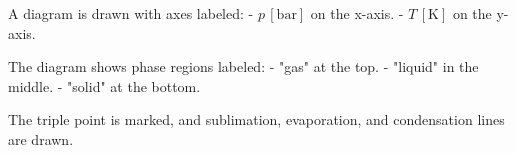 A diagram is drawn with axes labeled:  
- \( p \, [\text{bar}] \) on the x-axis.  
- \( T \, [\text{K}] \) on the y-axis.  

The diagram shows phase regions labeled:  
- "gas" at the top.  
- "liquid" in the middle.  
- "solid" at the bottom.  

The triple point is marked, and sublimation, evaporation, and condensation lines are drawn.